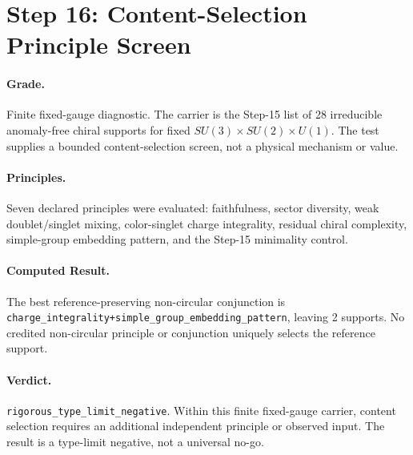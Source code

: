 \section{Step 16: Content-Selection Principle Screen}

\paragraph{Grade.}
Finite fixed-gauge diagnostic. The carrier is the Step-15 list of 28 irreducible anomaly-free chiral supports for fixed \(SU(3)\times SU(2)\times U(1)\). The test supplies a bounded content-selection screen, not a physical mechanism or value.

\paragraph{Principles.}
Seven declared principles were evaluated: faithfulness, sector diversity, weak doublet/singlet mixing, color-singlet charge integrality, residual chiral complexity, simple-group embedding pattern, and the Step-15 minimality control.

\paragraph{Computed Result.}
The best reference-preserving non-circular conjunction is \texttt{charge_integrality+simple_group_embedding_pattern}, leaving 2 supports. No credited non-circular principle or conjunction uniquely selects the reference support.

\paragraph{Verdict.}
\texttt{rigorous_type_limit_negative}. Within this finite fixed-gauge carrier, content selection requires an additional independent principle or observed input. The result is a type-limit negative, not a universal no-go.
